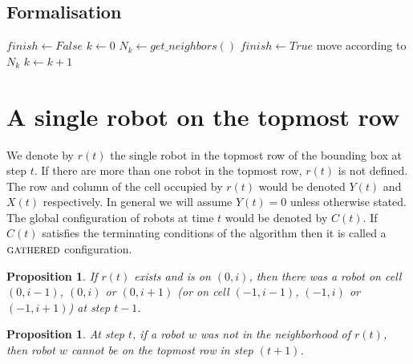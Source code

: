 \documentclass[11pt, a4paper]{article}
\theoremstyle{plain}
\newtheorem{prop}[thm]{Proposition}
\theoremstyle{definition}
\theoremstyle{remark}
\begin{document}
\subsection{Formalisation}
\begin{algorithm}[H]
  $finish \leftarrow False$\;
  $k \leftarrow 0$\;
   {
    $N_k \leftarrow get\_neighbors()$\;
     {
       {
          $finish \leftarrow True$\;
      }
       {
        move according to $N_k$\;
      }
    }
    $k \leftarrow k+1$\;
  }
  \caption{}
\end{algorithm}

\newcommand{\Gathered}{\ensuremath{\textsc{gathered}}\xspace}

\section{A single robot on the topmost row}

We denote by $r(t)$ the single robot in the topmost row of the bounding box at
step $t$. If there are more than one robot in the topmost row, $r(t)$ is not
defined.  The row and column of the cell occupied by $r(t)$ would be denoted
$Y(t)$ and $X(t)$ respectively. In general we will assume $Y(t)=0$ unless
otherwise stated.  The global configuration of robots at time $t$ would be
denoted by $C(t)$. If $C(t)$ satisfies the terminating conditions of the
algorithm then it is called a \Gathered configuration.

\begin{prop}
If $r(t)$ exists and is on $(0,i)$, then there was a robot on cell $(0,i-1)$,
$(0,i)$ or $(0,i+1)$ (or on cell $(-1,i-1)$, $(-1,i)$ or $(-1,i+1)$) at step
$t-1$.
\end{prop}

\begin{prop}
At step $t$, if a robot $w$ was not in the neighborhood of $r(t)$, then robot
$w$ cannot be on the topmost row in step $(t+1)$.
\end{prop}
\end{document}

